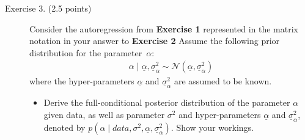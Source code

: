 \documentclass[12pt]{article}
\begin{document}
\begin{adjustwidth}{1cm}{1cm}
\newpage
\begin{description}
\item[Exercise 3. (2.5 points)] Consider the autoregression from \textbf{Exercise 1} represented in the matrix notation in your answer to \textbf{Exercise 2} Assume the following prior distribution for the parameter~$\alpha$:
\begin{align}
\alpha\mid\underline{\alpha}, \underline{\sigma}^2_\alpha \sim\mathcal{N}\left(\underline{\alpha}, \underline{\sigma}^2_\alpha\right)
\end{align}
where the hyper-parameters $\underline{\alpha}$ and $\underline{\sigma}^2_\alpha$ are assumed to be known.
\begin{itemize}
\item Derive the full-conditional posterior distribution of the parameter $\alpha$ given data, as well as parameter $\sigma^2$ and hyper-parameters $\underline{\alpha}$ and $\underline{\sigma}^2_\alpha$, denoted by $p\left(\alpha\mid data, \sigma^2, \underline{\alpha}, \underline{\sigma}^2_\alpha\right)$. Show your workings.
\end{itemize}


\end{description}
\end{adjustwidth}
\end{document}
